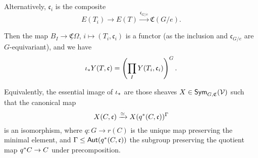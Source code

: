 \documentclass[a4paper,10pt
,draft
]{article}%
\newcommand{\UC}{\underline{\mathfrak C}}
\renewcommand{\1}{\ensuremath{\mathbb{id}}}
\begin{document}


{\color{blue} %
  Alternatively, $\mathfrak c_i$ is the composite
  \begin{equation}
        E(T_i) \to E(T) \xrightarrow{\mathfrak c_{G/e}} \mathfrak C(G/e).
  \end{equation}
} %

Then the map $B_I \to \UC\Omega$, $i \mapsto (T_i, \mathfrak c_i)$ is a functor
(as the inclusion {\color{blue} and $\mathfrak c_{G/e}$} are $G$-equivariant),
and we have
\begin{equation}
      \iota_{\**}Y(T, \mathfrak c) =
      \left(
            \prod_I Y(T_i, \mathfrak c_i)
      \right)^G.
\end{equation}



\begin{remark}[{cf. \cite[Rem 4.35]{BP17}}]
      Equivalently, the essential image of $\iota_{\**}$ are those sheaves $X \in \mathsf{Sym}_{G, \mathfrak C}(\mathcal V)$ such that
      the canonical map
      \begin{equation}
            X(C,\mathfrak c) \xrightarrow{\simeq} X(q^{\**}(C, \mathfrak c))^\Gamma
      \end{equation}
      is an isomorphism, where $q: G \to r(C)$ is the unique map preserving the minimal element, and
      $\Gamma \leq \mathsf{Aut}(q^{\**}(C,\mathfrak c))$ the subgroup preserving the quotient map $q^{\**}C \to C$
      under precomposition.
\end{remark}

\end{document}
